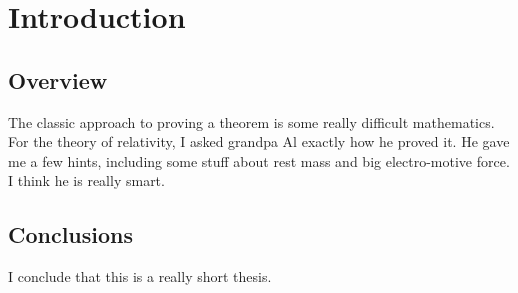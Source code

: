 \chapter{Introduction}
\section{\label{section:overview}Overview}
   The classic approach to proving a theorem is some really difficult 
   mathematics.  For the theory of relativity, I asked grandpa Al exactly 
   how he proved it.  He gave me a few hints, including some stuff about
   rest mass and big electro-motive force.  I think he is really smart.
\section{Conclusions}
   I conclude that this is a really short thesis.
